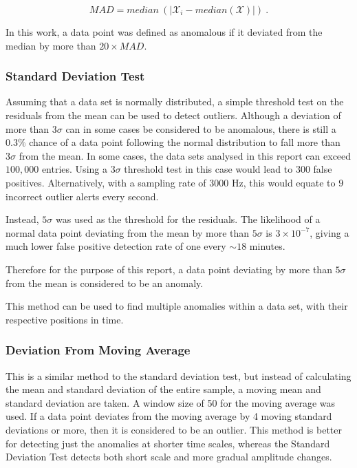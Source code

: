 \begin{equation}
    MAD = median~(|\mathcal{X}_i - median(\mathcal{X})|)~.
    \label{eq:MAD}
\end{equation}

In this work, a data point was defined as anomalous if it deviated from the median by more than $20 \times MAD$.

\subsubsection{Standard Deviation Test}
Assuming that a data set is normally distributed, a simple threshold test on the residuals from the mean can be used to detect outliers. 
Although a deviation of more than $3\sigma$ can in some cases be considered to be anomalous, there is still a $0.3\%$ chance of a data point following the normal distribution to fall more than $3\sigma$ from the mean. In some cases, the data sets analysed in this report can exceed $100,000$ entries. Using a $3\sigma$ threshold test in this case would lead to $300$ false positives. Alternatively, with a sampling rate of $3000$ Hz, this would equate to $9$ incorrect outlier alerts every second. 

Instead, $5\sigma$ was used as the threshold for the residuals. The likelihood of a normal data point deviating from the mean by more than $5\sigma$ is $3 \times 10^{-7}$, giving a much lower false positive detection rate of one every $\sim18$ minutes. 

Therefore for the purpose of this report, a data point deviating by more than $5\sigma$ from the mean is considered to be an anomaly. 

This method can be used to find multiple anomalies within a data set, with their respective positions in time.

\subsubsection{Deviation From Moving Average}
This is a similar method to the standard deviation test, but instead of calculating the mean and standard deviation of the entire sample, a moving mean and standard deviation are taken. A window size of 50 for the moving average was used.
If a data point deviates from the moving average by 4 moving standard deviations or more, then it is considered to be an outlier. This method is better for detecting just the anomalies at shorter time scales, whereas the Standard Deviation Test detects both short scale and more gradual amplitude changes. 

